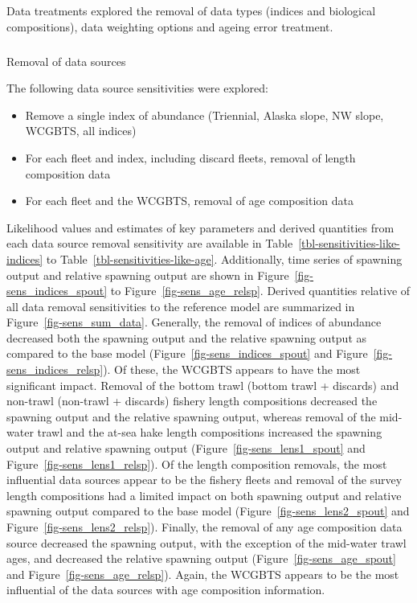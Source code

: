 \documentclass[
  english,
]{article}
\makeatletter
\let\oldsubparagraph\subparagraph
\renewcommand{\subparagraph}{
    \@ifstar
      \xxxSubParagraphStar
      \xxxSubParagraphNoStar
  }
\newcommand{\xxxSubParagraphStar}[1]{\oldsubparagraph*{#1}\mbox{}}
\newcommand{\xxxSubParagraphNoStar}[1]{\oldsubparagraph{#1}\mbox{}}
\providecommand{\tightlist}{%
  \setlength{\itemsep}{0pt}\setlength{\parskip}{0pt}}
\makeatother
\begin{document}
Data treatments explored the removal of data types (indices and
biological compositions), data weighting options and ageing error
treatment.

\subparagraph{Removal of data sources}\label{removal-of-data-sources}

The following data source sensitivities were explored:

\begin{itemize}
\tightlist
\item
  Remove a single index of abundance (Triennial, Alaska slope, NW slope,
  WCGBTS, all indices)
\item
  For each fleet and index, including discard fleets, removal of length
  composition data
\item
  For each fleet and the WCGBTS, removal of age composition data
\end{itemize}

Likelihood values and estimates of key parameters and derived quantities
from each data source removal sensitivity are available in
Table~\ref{tbl-sensitivities-like-indices} to
Table~\ref{tbl-sensitivities-like-age}. Additionally, time series of
spawning output and relative spawning output are shown in
Figure~\ref{fig-sens_indices_spout} to Figure~\ref{fig-sens_age_relsp}.
Derived quantities relative of all data removal sensitivities to the
reference model are summarized in Figure~\ref{fig-sens_sum_data}.
Generally, the removal of indices of abundance decreased both the
spawning output and the relative spawning output as compared to the base
model (Figure~\ref{fig-sens_indices_spout} and
Figure~\ref{fig-sens_indices_relsp}). Of these, the WCGBTS appears to
have the most significant impact. Removal of the bottom trawl (bottom
trawl + discards) and non-trawl (non-trawl + discards) fishery length
compositions decreased the spawning output and the relative spawning
output, whereas removal of the mid-water trawl and the at-sea hake
length compositions increased the spawning output and relative spawning
output (Figure~\ref{fig-sens_lens1_spout} and
Figure~\ref{fig-sens_lens1_relsp}). Of the length composition removals,
the most influential data sources appear to be the fishery fleets and
removal of the survey length compositions had a limited impact on both
spawning output and relative spawning output compared to the base model
(Figure~\ref{fig-sens_lens2_spout} and
Figure~\ref{fig-sens_lens2_relsp}). Finally, the removal of any age
composition data source decreased the spawning output, with the
exception of the mid-water trawl ages, and decreased the relative
spawning output (Figure~\ref{fig-sens_age_spout} and
Figure~\ref{fig-sens_age_relsp}). Again, the WCGBTS appears to be the
most influential of the data sources with age composition information.
\end{document}

